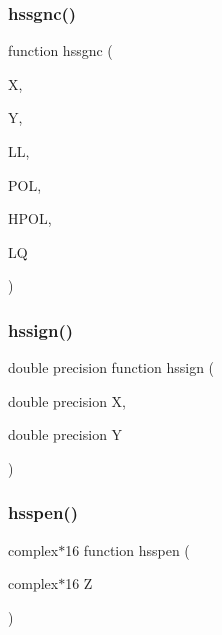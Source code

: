\mbox{\label{djangoh__h_8f_a8df1ca1337492f14b9737435536efb25}} 
\subsubsection{\texorpdfstring{hssgnc()}{hssgnc()}}
{\footnotesize\ttfamily function hssgnc (\begin{DoxyParamCaption}\item[{}]{X,  }\item[{}]{Y,  }\item[{}]{LL,  }\item[{}]{P\+OL,  }\item[{}]{H\+P\+OL,  }\item[{}]{LQ }\end{DoxyParamCaption})}

\mbox{\label{djangoh__h_8f_aa20f442acbbf3733b98be0aa1050a531}} 
\subsubsection{\texorpdfstring{hssign()}{hssign()}}
{\footnotesize\ttfamily double precision function hssign (\begin{DoxyParamCaption}\item[{double precision}]{X,  }\item[{double precision}]{Y }\end{DoxyParamCaption})}

\mbox{\label{djangoh__h_8f_ae7f485154ac96066356885f2e73926ad}} 
\subsubsection{\texorpdfstring{hsspen()}{hsspen()}}
{\footnotesize\ttfamily complex$\ast$16 function hsspen (\begin{DoxyParamCaption}\item[{complex$\ast$16}]{Z }\end{DoxyParamCaption})}

